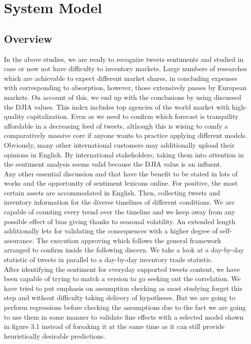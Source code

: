 \chapter{System Model}

\section{Overview}
In the above studies, we are ready to recognize tweets sentiments and studied in case or now not have difficulty to inventory markets. Large numbers of researches which are achievable to expect different market shares, in concluding expenses with corresponding to absorption, however, those extensively passes by European markets. On account of this, we end up with the conclusions by using discussed the DJIA values. This index includes top agencies of the world market with high-quality capitalization. Even as we need to confirm which forecast is tranquility affordable in a decreasing feed of tweets, although this is wising to comfy a comparatively massive core if anyone wants to practice applying different models. Obviously, many other international customers may additionally upload their opinions in English. By international stakeholders, taking them into attention in the sentiment analysis seems valid because the DJIA value is an influent.\\

Any other essential discussion and that have the benefit to be stated in lots of works and the opportunity of sentiment lexicons online. For positive, the most certain assets are accommodated in English. Then, collecting tweets and inventory information for the diverse timelines of different conditions. We are capable of counting every trend over the timeline and we keep away from any possible effect of bias giving thanks to seasonal volatility. An extended length additionally lets for validating the consequences with a higher degree of self-assurance. The execution approving which follows the general framework arranged to confirm inside the following discern. We take a look at a day-by-day statistic of tweets in parallel to a day-by-day inventory trade statistic.\\

After identifying the sentiment for everyday supported tweets content, we have been capable of trying to match a version to go seeking out the correlation. We have tried to put emphasis on assumption checking as most studying forget this step and without difficulty taking delivery of hypotheses. But we are going to perform regressions before checking the assumptions due to the fact we are going to use them in some manner to validate fine effects with a selected model shown in figure 3.1 instead of forsaking it at the same time as it can still provide heuristically desirable predictions.\\


